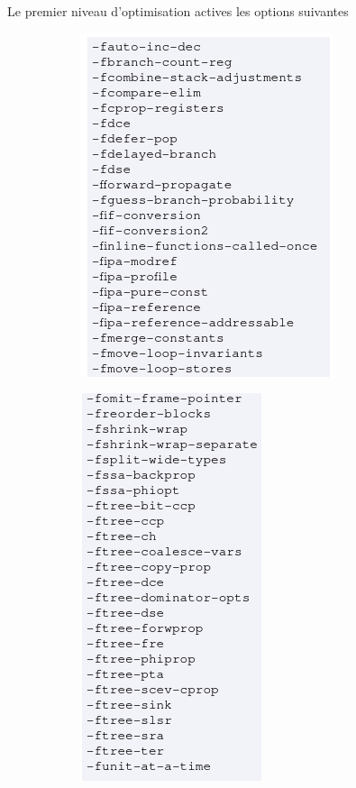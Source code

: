 \documentclass[11pt]{article} %
\begin{document}
Le premier niveau d'optimisation actives les options suivantes
\newpage
\begin{figure}[h!]
    \centering
    \begin{subfigure}[h!]{0.49\textwidth}
        \includegraphics[height=\linewidth]{./media/O1top}
    \end{subfigure}
    \begin{subfigure}[h!]{0.49\textwidth}
        \includegraphics[height=\linewidth]{./media/O1bot}
    \end{subfigure}
\end{figure}
\end{document}
